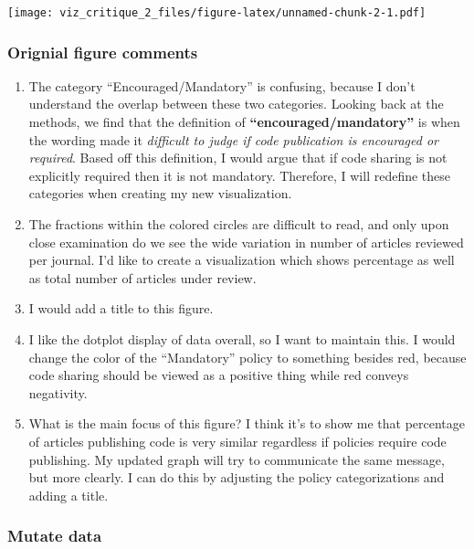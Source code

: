 \documentclass[
]{article}
\begin{document}
\texttt{[image: viz\_critique\_2\_files/figure-latex/unnamed-chunk-2-1.pdf]}

\hypertarget{orignial-figure-comments}{%
\subsubsection{Orignial figure
comments}\label{orignial-figure-comments}}

\begin{enumerate}
\def\labelenumi{\arabic{enumi}.}
\item
  The category ``Encouraged/Mandatory'' is confusing, because I don't
  understand the overlap between these two categories. Looking back at
  the methods, we find that the definition of
  \textbf{``encouraged/mandatory''} is when the wording made it
  \emph{difficult to judge if code publication is encouraged or
  required}. Based off this definition, I would argue that if code
  sharing is not explicitly required then it is not mandatory.
  Therefore, I will redefine these categories when creating my new
  visualization.
\item
  The fractions within the colored circles are difficult to read, and
  only upon close examination do we see the wide variation in number of
  articles reviewed per journal. I'd like to create a visualization
  which shows percentage as well as total number of articles under
  review.
\item
  I would add a title to this figure.
\item
  I like the dotplot display of data overall, so I want to maintain
  this. I would change the color of the ``Mandatory'' policy to
  something besides red, because code sharing should be viewed as a
  positive thing while red conveys negativity.
\item
  What is the main focus of this figure? I think it's to show me that
  percentage of articles publishing code is very similar regardless if
  policies require code publishing. My updated graph will try to
  communicate the same message, but more clearly. I can do this by
  adjusting the policy categorizations and adding a title.
\end{enumerate}

\hypertarget{mutate-data}{%
\subsubsection{Mutate data}\label{mutate-data}}
\end{document}

